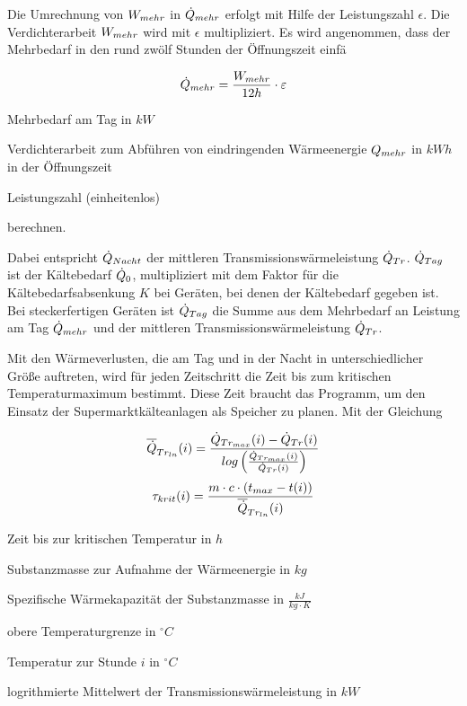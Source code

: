Die Umrechnung von $\lmehr$ in $\pmehr$ erfolgt mit Hilfe der Leistungszahl
$\epsilon$. Die Verdichterarbeit $\lmehr$ wird mit $\epsilon$ multipliziert.
Es wird angenommen, dass der Mehrbedarf in den rund zw\"olf Stunden der
\"Offnungszeit einf\"a

\begin{equation}
	\pmehr = \frac{\lmehr}{12h} \cdot \epsilon
\label{spmehr}
\end{equation}

\begin{description}[\dth]

	\item[$\pmehr$] Mehrbedarf am Tag in $kW$
	\item[$\lmehr$] Verdichterarbeit zum Abführen von eindringenden
		Wärmeenergie $Q_{mehr}$ in $kWh$ in der \"Offnungszeit
	\item[$\epsilon$] Leistungszahl (einheitenlos)

\end{description}
\vspace{0.5cm}
berechnen.

Dabei entspricht $\dot{Q}_{Nacht}$ der mittleren Transmissionswärmeleistung
$\dot{Q}_{Tr}$.
$\dot{Q}_{Tag}$ ist der Kältebedarf $\dot{Q}_{0}$, multipliziert mit dem Faktor für die
Kältebedarfsabsenkung $K$ bei Geräten, bei denen der Kältebedarf gegeben ist.
Bei steckerfertigen Geräten ist $\dot{Q}_{Tag}$ die Summe aus dem Mehrbedarf an Leistung
am Tag $\pmehr$ und der mittleren Transmissionswärmeleistung $\dot{Q}_{Tr}$.

Mit den Wärmeverlusten, die am Tag und in der Nacht in unterschiedlicher Größe
auftreten, wird für jeden Zeitschritt die Zeit bis zum kritischen
Temperaturmaximum bestimmt. Diese Zeit braucht das Programm, um den Einsatz der
Supermarktkälteanlagen als Speicher zu planen. Mit der Gleichung

\begin{equation}
	\aptranslog(i) = \frac{ \ptransm(i) - \ptrans(i) }{log \left(
		\frac{\ptransm(i)}{\ptrans(i)} \right)}
	\label{log}
\end{equation}
\begin{equation}
	\tau_{krit}(i) = \frac{m \cdot c \cdot (t_{max} -
		t(i))}{\aptranslog(i)}
\label{taukn}
\end{equation}

\begin{description}[\dth]

	\item[$\tau_{krit}$] Zeit bis zur kritischen Temperatur in $h$
	\item[$m$] Substanzmasse zur Aufnahme der Wärmeenergie in $kg$
	\item[$c$] Spezifische Wärmekapazität der Substanzmasse in $\frac{kJ}{kg
		\cdot K}$
	\item[$t_{max}$] obere Temperaturgrenze in $ ^{\circ} C $
	\item[$t(i)$] Temperatur zur Stunde $i$ in $ ^{\circ} C $
	\item[$\aptranslog$] logrithmierte Mittelwert der
		Transmissionswärmeleistung in $kW$
\end{description}
\vspace{0.5cm}


